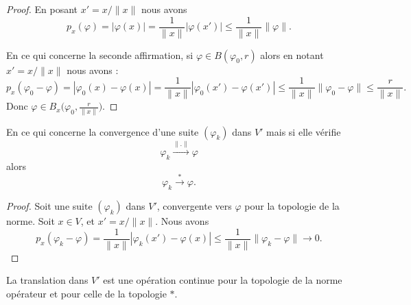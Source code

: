 \begin{proof}
    En posant \( x'=x/\| x \|\) nous avons
    \begin{equation}
        p_x(\varphi)=| \varphi(x) |=\frac{1}{ \| x \| }| \varphi(x') |\leq \frac{1}{ \| x \| }\| \varphi \|.
    \end{equation}

    En ce qui concerne la seconde affirmation, si \( \varphi\in B(\varphi_0,r)\) alors en notant \( x'=x/\| x \|\) nous avons :
    \begin{equation}
        p_x(\varphi_0-\varphi)=| \varphi_0(x)-\varphi(x) |=\frac{1}{ \| x \| }| \varphi_0(x')-\varphi(x') |\leq\frac{1}{ \| x \| }\|\varphi_0-\varphi  \|\leq \frac{ r }{ \| x \| }.
    \end{equation}
    Donc \( \varphi\in B_x\big( \varphi_0,\frac{ r }{ \| x \| } \big)\).
\end{proof}

\begin{proposition}
    En ce qui concerne la convergence d'une suite \( (\varphi_k)\) dans \( V'\) mais si elle vérifie
    \begin{equation}
        \varphi_k\stackrel{\| . \|}{\longrightarrow}\varphi
    \end{equation}
    alors
    \begin{equation}
        \varphi_k\stackrel{*}{\longrightarrow}\varphi.
    \end{equation}
\end{proposition}

\begin{proof}
    Soit une suite \( (\varphi_k)\) dans \( V'\), convergente vers \( \varphi\) pour la topologie de la norme.  Soit \( x\in V\), et \( x'=x/\| x \|\). Nous avons 
    \begin{equation}
        p_x(\varphi_k-\varphi)=\frac{1}{ \| x \| }| \varphi_k(x')-\varphi(x) |\leq\frac{1}{ \| x \| }\| \varphi_k-\varphi \|\to 0.
    \end{equation}
\end{proof}

\begin{lemma}       \label{LEMooEAVEooAFveHn}
    La translation dans \( V'\) est une opération continue pour la topologie de la norme opérateur et pour celle de la topologie \( *\).
\end{lemma}

